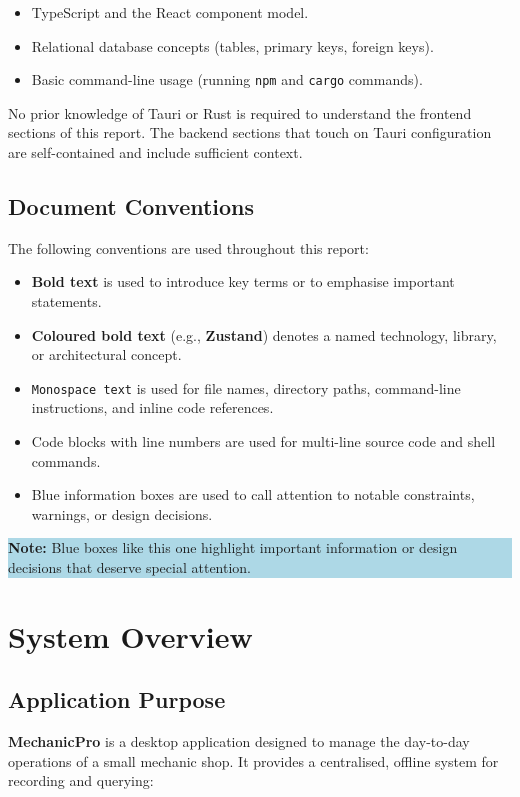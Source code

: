 \documentclass[12pt, a4paper]{report}
\newcommand{\infobox}[1]{%
	\vspace{6pt}
	\noindent
	\colorbox{LightBlue}{%
		\begin{minipage}{\dimexpr\linewidth-2\fboxsep}%
			\vspace{4pt}
			\small #1
			\vspace{4pt}
		\end{minipage}%
	}
	\vspace{6pt}
}
\newcommand{\term}[1]{\textbf{\color{Blue}#1}}
\begin{document}
	\begin{itemize}
		\item TypeScript and the React component model.
		\item Relational database concepts (tables, primary keys, foreign keys).
		\item Basic command-line usage (running \texttt{npm} and \texttt{cargo} commands).
	\end{itemize}
	
	No prior knowledge of Tauri or Rust is required to understand the frontend
	sections of this report. The backend sections that touch on Tauri configuration
	are self-contained and include sufficient context.
	
	\section{Document Conventions}
	The following conventions are used throughout this report:
	
	\begin{itemize}
		\item \textbf{Bold text} is used to introduce key terms or to emphasise
		      important statements.
		\item \term{Coloured bold text} (e.g., \term{Zustand}) denotes a named
		      technology, library, or architectural concept.
		\item \texttt{Monospace text} is used for file names, directory paths,
		      command-line instructions, and inline code references.
		\item Code blocks with line numbers are used for multi-line source code
		      and shell commands.
		\item Blue information boxes are used to call attention to notable
		      constraints, warnings, or design decisions.
	\end{itemize}
	
	\infobox{\textbf{Note:} Blue boxes like this one highlight important
		information or design decisions that deserve special attention.}
	
	\chapter{System Overview}
	
	\section{Application Purpose}
	\textbf{MechanicPro} is a desktop application designed to manage the
	day-to-day operations of a small mechanic shop. It provides a centralised,
	offline system for recording and querying:
\end{document}

